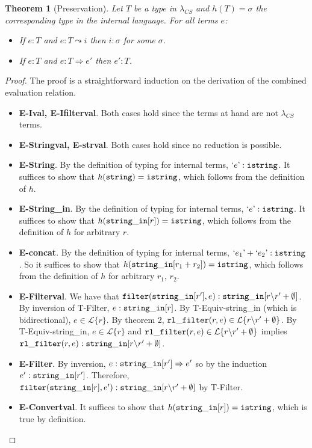 \documentclass[10pt,preprint]{sigplanconf}
\newtheorem{thm}{Theorem}
\theoremstyle{definition}
\newcommand{\Lagr}{\mathcal{L}}
\newcommand{\strin}{{\tt string\_in}}
\newcommand{\lang}[1]{\Lagr\{#1\}}
\newcommand{\str}{ {\tt string} }
\newcommand{\istr}{ {\tt istring} }
\newcommand{\filter}[2]{ {\tt filter}(#1,#2) }
\newcommand{\reduces}{ \Rightarrow }
\newcommand{\ireduces}{ \leadsto }
\newcommand{\istrf}[1]{`#1\textrm'} %
\newcommand{\lcs}{\lambda_{CS}}
\begin{document}
\begin{thm}[Preservation]
  Let $T$ be a type in $\lcs$ and $h(T)=\sigma$ the corresponding type in the internal language.
  For all terms $e$:
  \begin{itemize}
    \item If $e:T$ and $e:T \ireduces i$ then $i : \sigma$ for some $\sigma$.
    \item If $e:T$ and $e:T \reduces e'$ then $e':T$.
  \end{itemize}
\end{thm}
\begin{proof}
The proof is a straightforward induction on the derivation of the combined evaluation relation.
\begin{itemize}[label=$ $,itemsep=1ex]
  \item \textbf{E-Ival, E-Ifilterval}. Both cases hold since the terms at hand are not $\lcs$ terms.
  \item \textbf{E-Stringval, E-strval}. Both cases hold since no reduction is possible. 
  \item \textbf{E-String}. By the definition of typing for internal terms, $\istrf{e} : \istr$. It suffices to show that $h(\str) = \istr$, which follows from the definition of $h$.
  \item \textbf{E-String\_in}. By the definition of typing for internal terms, $\istrf{e} : \istr$. It suffices to show that $h(\strin[r]) = \istr$, which follows from the definition of $h$ for arbitrary $r$.
  \item \textbf{E-concat}. By the definition of typing for internal terms, $\istrf{e_1} + \istrf{e_2} : \istr$. So it suffices to show that $h(\strin[r_1+r_2]) = \istr$, which follows from the definition of $h$ for arbitrary $r_1$, $r_2$.
  \item \textbf{E-Filterval}. We have that $\filter{\strin[r']}{e}:\strin[r\backslash r' + \emptyset]$. By inversion of T-Filter, $e:\strin[r]$.
    By T-Equiv-string\_in (which is bidirectional), $e \in \lang{r}$.
    By theorem 2, ${\tt rl\_filter}(r,e) \in \lang{r\backslash r' + \emptyset}$.
    By T-Equiv-string\_in,  $e \in \lang{r}$ and ${\tt rl\_filter}(r,e) \in \lang{r\backslash r' + \emptyset}$ implies ${\tt rl\_filter}(r,e):\strin[r\backslash r' + \emptyset]$.
  \item \textbf{E-Filter}. By inversion, $e : \strin[r'] \reduces e'$ so by the induction $e':\strin[r']$.
    Therefore, ${\tt filter}(\strin[r], e') : \strin[r \backslash r' + \emptyset]$ by T-Filter.
  \item \textbf{E-Convertval}. It suffices to show that $h(\strin[r]) = \istr$, which is true by definition.

\end{itemize}
\end{proof}
\end{document}
